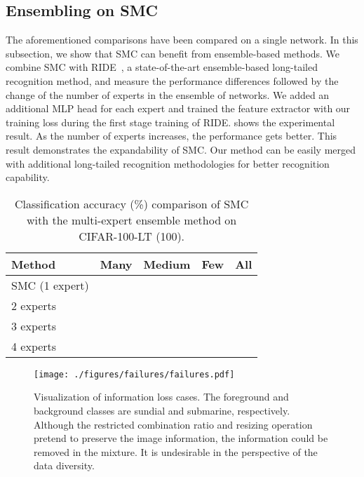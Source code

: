 \documentclass[10pt,twocolumn,letterpaper]{article}
\begin{document}
\subsection{Ensembling on SMC}
The aforementioned comparisons have been compared on a single network. In this subsection, we show that SMC can benefit from ensemble-based methods.
We combine SMC with RIDE~\cite{RIDE}, a state-of-the-art ensemble-based long-tailed recognition method, and measure the performance differences followed by the change of the number of experts in the ensemble of networks.
We added an additional MLP head for each expert and trained the feature extractor with our training loss during the first stage training of RIDE.
 shows the experimental result.  
As the number of experts increases, the performance gets better. This result demonstrates the expandability of SMC. Our method can be easily merged with additional long-tailed recognition methodologies for better recognition capability.


\begin{table}[t]
    \centering
    \begin{tabular}{l | c c c c }
        \hline
        Method & Many & Medium & Few & All\\
        \hline
        SMC (1 expert) &  &  &  &  \\
        2 experts      &  &  &  &  \\
        3 experts      &  &  &  &  \\
        4 experts      &  &  &  &  \\
        \hline
    \end{tabular}
    \caption{Classification accuracy (\%) comparison of SMC with the multi-expert ensemble method on CIFAR-100-LT (100).}
    \label{SMCtable:ensemble}
\end{table}


\begin{figure}[t]
    \centering
    \texttt{[image: ./figures/failures/failures.pdf]}
    \caption{Visualization of information loss cases. The foreground and background classes are sundial and submarine, respectively. Although the restricted combination ratio and resizing operation pretend to preserve the image information, the information could be removed in the mixture. It is undesirable in the perspective of the data diversity. }
    \label{SMCfig:failures}
\end{figure}
\end{document}
